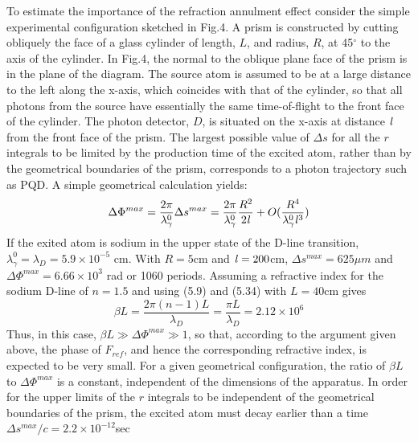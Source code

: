 \documentclass [12pt]{article}
\begin{document}
{     \par To estimate the importance of the refraction annulment effect consider
      the simple experimental configuration sketched in Fig.4. A prism is constructed
     by cutting obliquely the face of a glass cylinder of length, $L$,
     and radius, $R$, at 45$^\circ$ to the axis of the 
     cylinder. In Fig.4, the normal to the oblique plane face
     of the prism is in the plane of the diagram. The source atom is assumed to be 
     at a large distance to the left along the x-axis, which coincides with that 
     of the cylinder, so that all photons from the source have essentially the 
     same time-of-flight to the front face of the cylinder. The photon detector,
     $D$, is situated on the x-axis at distance ${\it l}$ from the front face of
     the prism. The largest possible value of $\Delta s$ for all the $r$ integrals
     to be limited by the production time of the excited atom, rather than by
     the geometrical boundaries of the prism, corresponds to a photon
     trajectory such as PQD. A simple geometrical calculation yields:
     \begin{equation}
      \Delta \Phi^{max} = \frac{2 \pi}{\lambda_{\gamma}^0}\Delta s^{max}
        =  \frac{2 \pi}{\lambda_{\gamma}^0}\frac{R^2}{2 {\it l}}+ O(\frac{R^4}{\lambda_{\gamma}^0{\it l}^3})
     \end{equation}
     If the exited atom is sodium in the upper state of the D-line transition,
      $\lambda_{\gamma}^0 = \lambda_{D} = 5.9 \times 10^{-5}$ cm. With $R = 5$cm
     and ${\it l} = 200$cm, $\Delta s^{max} = 625\mu m$ and $ \Delta \Phi^{max} = 
     6.66 \times 10^3$ rad or 1060 periods. Assuming a refractive index for
     the sodium D-line of $n = 1.5$ and using (5.9) and (5.34) with
     $L = 40$cm gives
    \begin{equation}
     \beta L = \frac{2\pi(n-1) L}{\lambda_D} = \frac{\pi L}{\lambda_D} = 2.12 \times 10^6
    \end{equation}
     Thus, in this case, $\beta L \gg  \Delta \Phi^{max} \gg 1$, so that,
       according to the argument given above,
     the phase of $F_{ref}$, and hence the corresponding refractive index, is expected to be
     very small. For a given
     geometrical configuration, the ratio of $\beta L$ to $\Delta \Phi^{max}$
     is a constant, independent of the dimensions of the apparatus.
     In order for the upper limits of the $r$ integrals to be independent of
     the geometrical boundaries of the prism, the excited atom
     must decay earlier than a time $\Delta s^{max}/c = 2.2 \times 10^{-12}$sec
}
\end{document}
